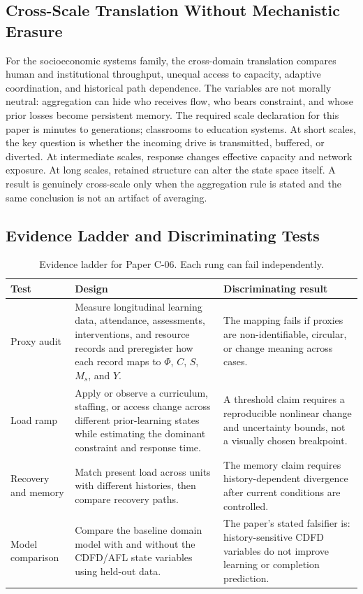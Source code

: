 \documentclass[11pt,a4paper]{article}
\begin{document}
\subsection{Cross-Scale Translation Without Mechanistic Erasure}

For the socioeconomic systems family, the cross-domain translation compares human and institutional throughput, unequal access to capacity, adaptive coordination, and historical path dependence. The variables are not morally neutral: aggregation can hide who receives flow, who bears constraint, and whose prior losses become persistent memory. \cite{BarabasiAlbert1999,WattsStrogatz1998,Holling1973,Shannon1948}
The required scale declaration for this paper is minutes to generations; classrooms to education systems. At short
scales, the key question is whether the incoming drive is transmitted,
buffered, or diverted. At intermediate scales, response changes effective
capacity and network exposure. At long scales, retained structure can alter the
state space itself. A result is genuinely cross-scale only when the aggregation
rule is stated and the same conclusion is not an artifact of averaging.

\subsection{Evidence Ladder and Discriminating Tests}

\begin{table}[htbp]
\centering
\small
\caption{Evidence ladder for Paper C-06. Each rung can fail independently.}
\begin{tabularx}{\textwidth}{|p{}|X|X|}
\hline
\textbf{Test} & \textbf{Design} & \textbf{Discriminating result} \\
\hline
Proxy audit & Measure longitudinal learning data, attendance, assessments, interventions, and resource records and preregister how each record maps to $\Phi$, $C$, $S$, $M_s$, and $Y$. & The mapping fails if proxies are non-identifiable, circular, or change meaning across cases. \\
\hline
Load ramp & Apply or observe a curriculum, staffing, or access change across different prior-learning states while estimating the dominant constraint and response time. & A threshold claim requires a reproducible nonlinear change and uncertainty bounds, not a visually chosen breakpoint. \\
\hline
Recovery and memory & Match present load across units with different histories, then compare recovery paths. & The memory claim requires history-dependent divergence after current conditions are controlled. \\
\hline
Model comparison & Compare the baseline domain model with and without the CDFD/AFL state variables using held-out data. & The paper's stated falsifier is: history-sensitive CDFD variables do not improve learning or completion prediction. \\
\hline
\end{tabularx}
\end{table}
\end{document}
